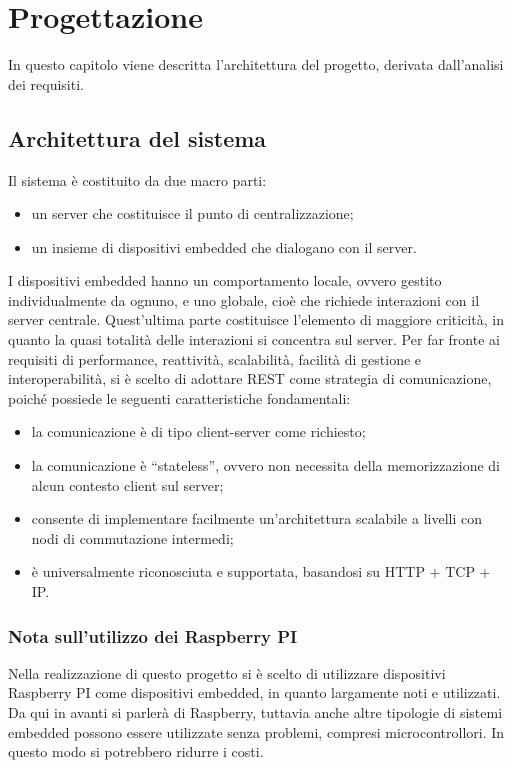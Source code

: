 \chapter{Progettazione}

In questo capitolo viene descritta l'architettura del progetto, derivata dall'analisi dei requisiti.

\section{Architettura del sistema}
Il sistema è costituito da due macro parti:
\begin{itemize}
 \item un server che costituisce il punto di centralizzazione;
 \item un insieme di dispositivi embedded che dialogano con il server.
\end{itemize}
I dispositivi embedded hanno un comportamento locale, ovvero gestito individualmente da ognuno, e uno globale, cioè che richiede interazioni con il server centrale.
Quest'ultima parte costituisce l'elemento di maggiore criticità, in quanto la quasi totalità delle interazioni si concentra sul server.
Per far fronte ai requisiti di performance, reattività, scalabilità, facilità di gestione e interoperabilità, si è scelto di adottare REST come strategia di comunicazione, poiché possiede le seguenti caratteristiche fondamentali:
\begin{itemize}
 \item la comunicazione è di tipo client-server come richiesto;
 \item la comunicazione è ``stateless'', ovvero non necessita della memorizzazione di alcun contesto client sul server;
 \item consente di implementare facilmente un'architettura scalabile a livelli con nodi di commutazione intermedi;
 \item è universalmente riconosciuta e supportata, basandosi su HTTP + TCP + IP.
\end{itemize}
\subsection{Nota sull'utilizzo dei Raspberry PI}
Nella realizzazione di questo progetto si è scelto di utilizzare dispositivi Raspberry PI come dispositivi embedded, in quanto largamente noti e utilizzati.
Da qui in avanti si parlerà di Raspberry, tuttavia anche altre tipologie di sistemi embedded possono essere utilizzate senza problemi, compresi microcontrollori.
In questo modo si potrebbero ridurre i costi.


